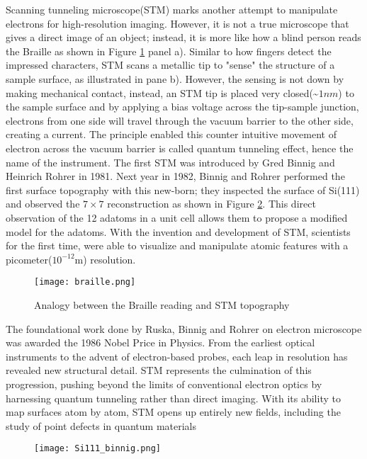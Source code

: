 Scanning tunneling microscope(STM) marks another attempt to manipulate electrons for high-resolution imaging. However, it is not a true microscope that gives a direct image of an object; instead, it is more like how a blind person reads the Braille as shown in Figure \ref{fig:braille} panel a). Similar to how fingers detect the impressed characters, \ac{STM} scans a metallic tip to "sense" the structure of a sample surface, as illustrated in pane b). However, the sensing is not down by making mechanical contact, instead, an \ac{STM} tip is placed very closed(\textasciitilde $1nm$) to the sample surface and by applying a bias voltage across the tip-sample junction, electrons from one side will travel through the vacuum barrier to the other side, creating a current. The principle enabled this counter intuitive movement of electron across the vacuum barrier is called quantum tunneling effect, hence the name of the instrument. The first \ac{STM} was introduced by Gred Binnig and Heinrich Rohrer in 1981. Next year in 1982, Binnig and Rohrer performed the first surface topography with this new-born; they inspected the surface of Si(111) and observed the $7 \times 7$ reconstruction as shown in Figure \ref{figure:si111_binnig}\cite{binnig77Reconstruction1983}. This direct observation of the 12 adatoms in a unit cell allows them to propose a modified model for the adatoms. With the invention and development of \ac{STM}, scientists for the first time, were able to visualize and manipulate atomic features with a picometer($10^{-12}$m) resolution.
\begin{figure}
	\centering
	\texttt{[image: braille.png]}
	\caption{Analogy between the Braille reading and STM topography}
	\label{fig:braille}
\end{figure}
The foundational work done by Ruska, Binnig and Rohrer on electron microscope was awarded the 1986 Nobel Price in Physics. From the earliest optical instruments to the advent of electron-based probes, each leap in resolution has revealed new structural detail. STM represents the culmination of this progression, pushing beyond the limits of conventional electron optics by harnessing quantum tunneling rather than direct imaging. With its ability to map surfaces atom by atom, STM opens up entirely new fields, including the study of point defects in quantum materials

\begin{figure}
	\centering
	\texttt{[image: Si111\_binnig.png]}
	\caption{}
	\label{figure:si111_binnig}
\end{figure}


